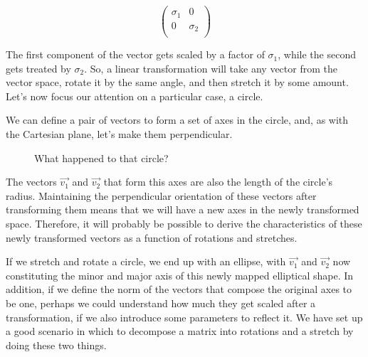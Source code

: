 \documentclass[600paper, 11pt,twoside,openany]{kdp}
\begin{document}
\[
\begin{pmatrix}
\sigma_1 & 0\\
0 & \sigma_2 \\
\end{pmatrix}
\]
\par 
\vspace{-3pt}
\indent The first component of the vector gets scaled by a factor of $\sigma_1$, while the second gets treated by $\sigma_2$. So, a linear transformation will take any vector from the vector space, rotate it by the same angle, and then stretch it by some amount. Let’s now focus our attention on a particular case, a circle.
\par 
\vspace{-3pt}
\indent 
We can define a pair of vectors to form a set of axes in the circle, and, as with the Cartesian plane, let’s make them perpendicular. 
\begin{figure}[h!]
\begin{center}
\end{center}
\vspace*{3pt}
\caption{What happened to that circle?}
\end{figure}
\indent 

The vectors $\overrightarrow{v_1}$ and $\overrightarrow{v_2}$ that form this axes are also the length of the circle’s radius. Maintaining the perpendicular orientation of these vectors after transforming them means that we will have a new axes in the newly transformed space. Therefore, it will probably be possible to derive the characteristics of these newly transformed vectors as a function of rotations and stretches. 
\par 
\vspace{-3pt}
\indent 
If we stretch and rotate a circle, we end up with an ellipse, with $\overrightarrow{v_1}$ and $\overrightarrow{v_2}$ now constituting the minor and major axis of this newly mapped elliptical shape. In addition, if we define the norm of the vectors that compose the original axes to be one, perhaps we could understand how much they get scaled after a transformation, if we also introduce some parameters to reflect it. We have set up a good scenario in which to decompose a matrix into rotations and a stretch by doing these two things. 
\end{document}
